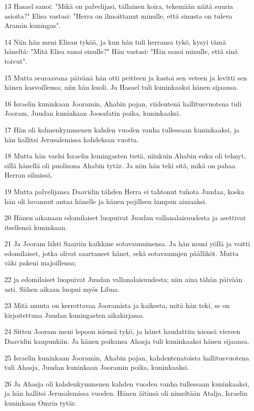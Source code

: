 \par 13 Hasael sanoi: "Mikä on palvelijasi, tällainen koira, tekemään näitä suuria asioita?" Elisa vastasi: "Herra on ilmoittanut minulle, että sinusta on tuleva Aramin kuningas".
\par 14 Niin hän meni Elisan tyköä, ja kun hän tuli herransa tykö, kysyi tämä häneltä: "Mitä Elisa sanoi sinulle?" Hän vastasi: "Hän sanoi minulle, että sinä toivut".
\par 15 Mutta seuraavana päivänä hän otti peitteen ja kastoi sen veteen ja levitti sen hänen kasvoillensa; niin hän kuoli. Ja Hasael tuli kuninkaaksi hänen sijaansa.
\par 16 Israelin kuninkaan Jooramin, Ahabin pojan, viidentenä hallitusvuotena tuli Jooram, Juudan kuninkaan Joosafatin poika, kuninkaaksi.
\par 17 Hän oli kolmenkymmenen kahden vuoden vanha tullessaan kuninkaaksi, ja hän hallitsi Jerusalemissa kahdeksan vuotta.
\par 18 Mutta hän vaelsi Israelin kuningasten tietä, niinkuin Ahabin suku oli tehnyt, sillä hänellä oli puolisona Ahabin tytär. Ja niin hän teki sitä, mikä on pahaa Herran silmissä.
\par 19 Mutta palvelijansa Daavidin tähden Herra ei tahtonut tuhota Juudaa, koska hän oli luvannut antaa hänelle ja hänen pojilleen lampun ainiaaksi.
\par 20 Hänen aikanaan edomilaiset luopuivat Juudan vallanalaisuudesta ja asettivat itsellensä kuninkaan.
\par 21 Ja Jooram lähti Saairiin kaikkine sotavaunuinensa. Ja hän nousi yöllä ja voitti edomilaiset, jotka olivat saartaneet hänet, sekä sotavaunujen päälliköt. Mutta väki pakeni majoillensa;
\par 22 ja edomilaiset luopuivat Juudan vallanalaisuudesta; niin aina tähän päivään asti. Siihen aikaan luopui myös Libna.
\par 23 Mitä muuta on kerrottavaa Jooramista ja kaikesta, mitä hän teki, se on kirjoitettuna Juudan kuningasten aikakirjassa.
\par 24 Sitten Jooram meni lepoon isiensä tykö, ja hänet haudattiin isiensä viereen Daavidin kaupunkiin. Ja hänen poikansa Ahasja tuli kuninkaaksi hänen sijaansa.
\par 25 Israelin kuninkaan Jooramin, Ahabin pojan, kahdentenatoista hallitusvuotena tuli Ahasja, Juudan kuninkaan Jooramin poika, kuninkaaksi.
\par 26 Ja Ahasja oli kahdenkymmenen kahden vuoden vanha tullessaan kuninkaaksi, ja hän hallitsi Jerusalemissa vuoden. Hänen äitinsä oli nimeltään Atalja, Israelin kuninkaan Omrin tytär.
